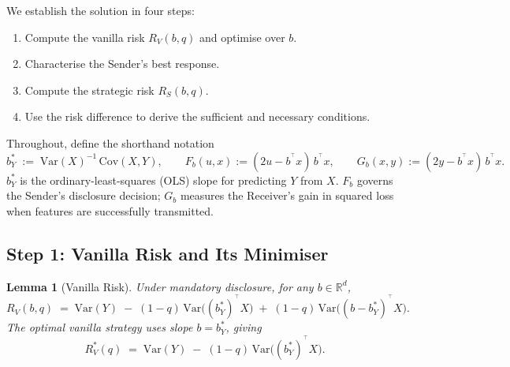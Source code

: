 \documentclass[11pt]{article}
\newtheorem{lemma}[theorem]{Lemma}
\theoremstyle{definition}
\theoremstyle{remark}
\newcommand{\R}{\mathbb{R}}
\newcommand{\T}{^{\top}}
\begin{document}
We establish the solution in four steps:
\begin{enumerate}
  \item Compute the vanilla risk $R_{V}(b,q)$ and optimise over $b$.
  \item Characterise the Sender's best response.
  \item Compute the strategic risk $R_{S}(b,q)$.
  \item Use the risk difference to derive the sufficient and necessary conditions.
\end{enumerate}

Throughout, define the shorthand notation
\[
  b_{Y}^{*}
  \;:=\;
  \mathrm{Var}(X)^{-1}\,\mathrm{Cov}(X,Y),
  \qquad
  F_{b}(u,x) := (2u - b^{\T}x)\,b^{\T}x,
  \qquad
  G_{b}(x,y) := (2y - b^{\T}x)\,b^{\T}x.
\]
$b_{Y}^{*}$ is the ordinary-least-squares (OLS) slope for predicting $Y$ from $X$.
$F_{b}$ governs the Sender's disclosure decision; $G_{b}$ measures the Receiver's
gain in squared loss when features are successfully transmitted.

\subsection{Step 1: Vanilla Risk and Its Minimiser}

\begin{lemma}[Vanilla Risk]\label{lem:vanilla}
  Under mandatory disclosure, for any $b \in \R^{d}$,
  \begin{equation}\label{eq:vanilla}
    R_{V}(b,q)
    \;=\;
    \mathrm{Var}(Y)
    \;-\;
    (1-q)\,\mathrm{Var}\!\bigl((b_{Y}^{*})^{\T}X\bigr)
    \;+\;
    (1-q)\,\mathrm{Var}\!\bigl((b-b_{Y}^{*})^{\T}X\bigr).
  \end{equation}
  The optimal vanilla strategy uses slope $b = b_{Y}^{*}$, giving
  \begin{equation}\label{eq:vanilla-opt}
    R_{V}^{*}(q)
    \;=\;
    \mathrm{Var}(Y)
    \;-\;
    (1-q)\,\mathrm{Var}\!\bigl((b_{Y}^{*})^{\T}X\bigr).
  \end{equation}
\end{lemma}
\end{document}

